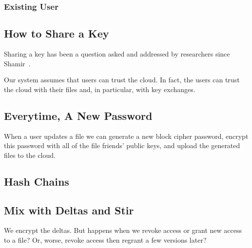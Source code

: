\subsubsection*{Existing \name User}

\subsection{How to Share a Key}

Sharing a key has been a question asked and addressed by researchers since Shamir~\cite{shamir}. 

Our system assumes that users can trust the cloud. In fact, the users can trust the cloud with their files and, in particular, with key exchanges. 



\subsection{Everytime, A New Password}

When a user updates a file we can generate a new block cipher
password, encrypt this password with all of the file friends' public
keys, and upload the generated files to the cloud.

\subsection{Hash Chains}


\subsection{Mix with Deltas and Stir}

We encrypt the deltas. But happens when we revoke access or grant new
access to a file? Or, worse, revoke access then regrant a few versions
later?



